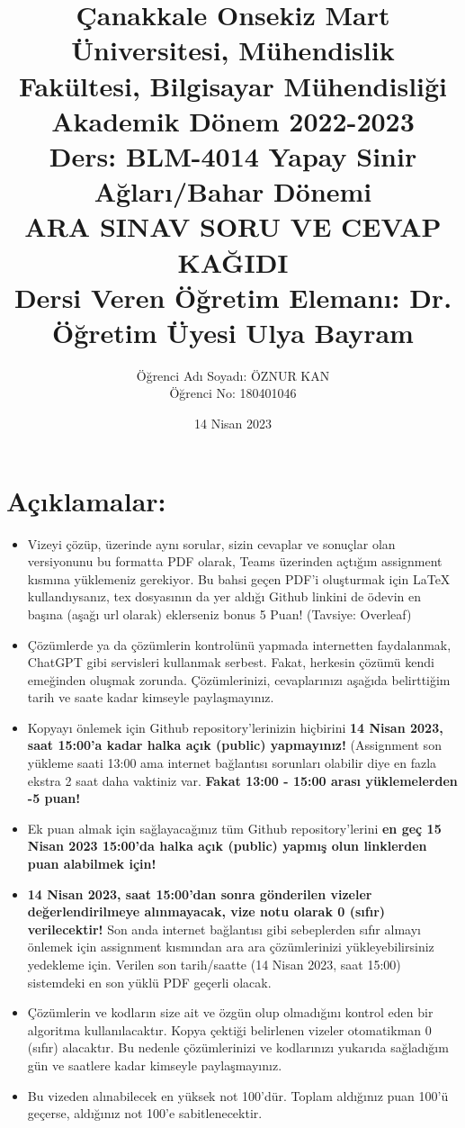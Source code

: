\documentclass[11pt]{article}
\title{Çanakkale Onsekiz Mart Üniversitesi, Mühendislik Fakültesi, Bilgisayar Mühendisliği Akademik Dönem 2022-2023\\
Ders: BLM-4014 Yapay Sinir Ağları/Bahar Dönemi\\ 
ARA SINAV SORU VE CEVAP KAĞIDI\\
Dersi Veren Öğretim Elemanı: Dr. Öğretim Üyesi Ulya Bayram}
\author{%
\begin{minipage}{\textwidth}
\raggedright
Öğrenci Adı Soyadı: ÖZNUR KAN\\ %
Öğrenci No: 180401046
\end{minipage}%
}
\date{14 Nisan 2023}
\begin{document}
\maketitle

\vspace{-.5in}
\section*{Açıklamalar:}
\begin{itemize}
    \item Vizeyi çözüp, üzerinde aynı sorular, sizin cevaplar ve sonuçlar olan versiyonunu bu formatta PDF olarak, Teams üzerinden açtığım assignment kısmına yüklemeniz gerekiyor. Bu bahsi geçen PDF'i oluşturmak için LaTeX kullandıysanız, tex dosyasının da yer aldığı Github linkini de ödevin en başına (aşağı url olarak) eklerseniz bonus 5 Puan! (Tavsiye: Overleaf)
    \item Çözümlerde ya da çözümlerin kontrolünü yapmada internetten faydalanmak, ChatGPT gibi servisleri kullanmak serbest. Fakat, herkesin çözümü kendi emeğinden oluşmak zorunda. Çözümlerinizi, cevaplarınızı aşağıda belirttiğim tarih ve saate kadar kimseyle paylaşmayınız. 
    \item Kopyayı önlemek için Github repository'lerinizin hiçbirini \textbf{14 Nisan 2023, saat 15:00'a kadar halka açık (public) yapmayınız!} (Assignment son yükleme saati 13:00 ama internet bağlantısı sorunları olabilir diye en fazla ekstra 2 saat daha vaktiniz var. \textbf{Fakat 13:00 - 15:00 arası yüklemelerden -5 puan!}
    \item Ek puan almak için sağlayacağınız tüm Github repository'lerini \textbf{en geç 15 Nisan 2023 15:00'da halka açık (public) yapmış olun linklerden puan alabilmek için!}
    \item \textbf{14 Nisan 2023, saat 15:00'dan sonra gönderilen vizeler değerlendirilmeye alınmayacak, vize notu olarak 0 (sıfır) verilecektir!} Son anda internet bağlantısı gibi sebeplerden sıfır almayı önlemek için assignment kısmından ara ara çözümlerinizi yükleyebilirsiniz yedekleme için. Verilen son tarih/saatte (14 Nisan 2023, saat 15:00) sistemdeki en son yüklü PDF geçerli olacak.
    \item Çözümlerin ve kodların size ait ve özgün olup olmadığını kontrol eden bir algoritma kullanılacaktır. Kopya çektiği belirlenen vizeler otomatikman 0 (sıfır) alacaktır. Bu nedenle çözümlerinizi ve kodlarınızı yukarıda sağladığım gün ve saatlere kadar kimseyle paylaşmayınız.
    \item Bu vizeden alınabilecek en yüksek not 100'dür. Toplam aldığınız puan 100'ü geçerse, aldığınız not 100'e sabitlenecektir.

\end{itemize}
\end{document}
